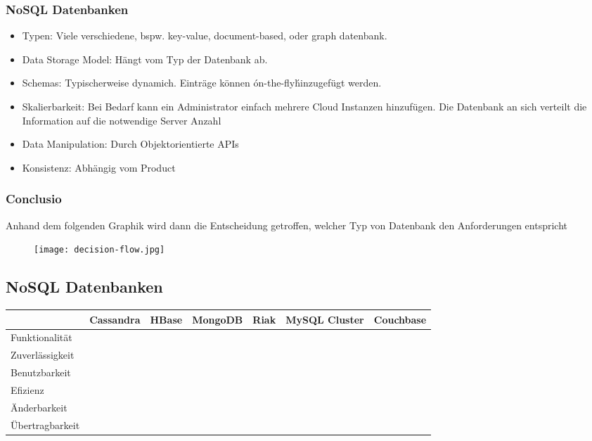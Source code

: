 		\subsubsection{NoSQL Datenbanken}
			\begin{itemize}
				\item Typen: Viele verschiedene, bspw. key-value, document-based, oder graph datenbank.
				\item Data Storage Model: Hängt vom Typ der Datenbank ab.
				\item Schemas: Typischerweise dynamich. Einträge können \'on-the-fly\' hinzugefügt werden.
				\item Skalierbarkeit: Bei Bedarf kann ein Administrator einfach mehrere Cloud Instanzen hinzufügen. Die Datenbank an sich verteilt die Information auf die notwendige Server Anzahl
				\item Data Manipulation: Durch Objektorientierte APIs
				\item Konsistenz: Abhängig vom Product
			\end{itemize}

		\newpage
		\vfill
		\subsubsection{Conclusio}
		Anhand dem folgenden Graphik wird dann die Entscheidung getroffen, welcher Typ von Datenbank den Anforderungen entspricht
		 
		\begin{figure}[h!]
			\texttt{[image: decision-flow.jpg]}
			\centering
		\end{figure}
		\newpage
		\vfill

	\subsection{NoSQL Datenbanken}

		\begin{tabular} {| l | c | c | c | c | c | c |}
			\hline
			& Cassandra & HBase & MongoDB & Riak & MySQL Cluster & Couchbase		\\ \hline \hline
			Funktionalität &  &	 &  &  &  &  &		\\ \hline
			Zuverlässigkeit &  &	 &  &  &  &  &	 			\\ \hline
			Benutzbarkeit &  &	 &  &  &  &  &	 		\\ \hline
			Efizienz &  &	 &  &  &  &  &			\\ \hline
			Änderbarkeit &  &  &  &  &  &  &		\\ \hline 
			Übertragbarkeit	&  &	&  &  &  &  &					\\ \hline
		\end{tabular}

